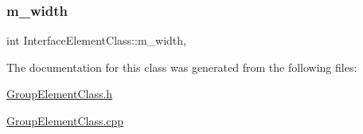 \subsubsection{\texorpdfstring{m\+\_\+width}{m\_width}}
{\footnotesize\ttfamily int Interface\+Element\+Class\+::m\+\_\+width\hspace{0.3cm}{\ttfamily [protected]}, {\ttfamily [inherited]}}



The documentation for this class was generated from the following files\+:\begin{DoxyCompactItemize}
\item 
\hyperlink{_group_element_class_8h}{Group\+Element\+Class.\+h}\item 
\hyperlink{_group_element_class_8cpp}{Group\+Element\+Class.\+cpp}\end{DoxyCompactItemize}
